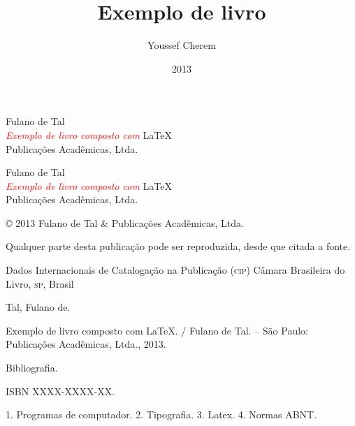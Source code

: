 \documentclass[
	10pt,				%
	openright,			%
	twoside,			%
	a5paper,			%
	english,			%
	french,				%
	spanish,			%
	brazil,				%
]{abntex2}
\title{Exemplo de livro}
\author{Youssef Cherem}
\date{2013}
\begin{document}
\frenchspacing

\frontmatter

\begin{titlingpage}

\phantom{xxx}
\vspace{0.5cm}
\huge
\raggedright
Fulano de Tal\\
\vspace{2.5cm}
\Huge 
{\raggedleft
\textit{\textcolor{red}{Exemplo de livro composto com}} \LaTeX\\[1cm]
}
\centering 
\vfill
\Large
Publicações Acadêmicas, Ltda.

\end{titlingpage}

\begin{titlingpage}

\phantom{xxx}
\vspace{0.5cm}
\huge
\raggedright
Fulano de Tal\\
\vspace{2.5cm}
\Huge 
{\raggedleft
\textit{\textcolor{red}{Exemplo de livro composto com}} \LaTeX\\[1cm]
}
\centering 
\vfill
\Large
Publicações Acadêmicas, Ltda.

\clearpage
\footnotesize
© 2013 Fulano de Tal \& Publicações Acadêmicas, Ltda.

Qualquer parte desta publicação pode ser reproduzida, desde que citada a fonte.

\bigskip

\begin{center}
Dados Internacionais de Catalogação na Publicação (\textsc{cip})
Câmara Brasileira do Livro, \textsc{sp}, Brasil
\end{center}

\begin{mdframed}
\noindent Tal, Fulano de.

Exemplo de livro composto com \LaTeX. / Fulano de Tal. -- São Paulo: Publicações Acadêmicas, Ltda., 2013.

\medskip

Bibliografia.

ISBN XXXX-XXXX-XX.

\medskip

1. Programas de computador. 2. Tipografia. 3. Latex. 4. Normas ABNT.

\end{mdframed}

\end{titlingpage}
\end{document}
